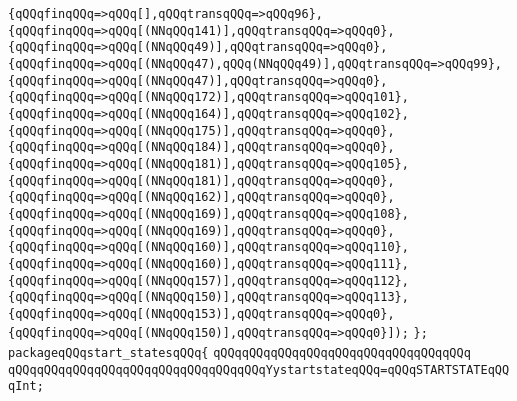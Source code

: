 \verb|{qQQqfinqQQq=>qQQq[],qQQqtransqQQq=>qQQq96},|\newline
\verb|{qQQqfinqQQq=>qQQq[(NNqQQq141)],qQQqtransqQQq=>qQQq0},|\newline
\verb|{qQQqfinqQQq=>qQQq[(NNqQQq49)],qQQqtransqQQq=>qQQq0},|\newline
\verb|{qQQqfinqQQq=>qQQq[(NNqQQq47),qQQq(NNqQQq49)],qQQqtransqQQq=>qQQq99},|\newline
\verb|{qQQqfinqQQq=>qQQq[(NNqQQq47)],qQQqtransqQQq=>qQQq0},|\newline
\verb|{qQQqfinqQQq=>qQQq[(NNqQQq172)],qQQqtransqQQq=>qQQq101},|\newline
\verb|{qQQqfinqQQq=>qQQq[(NNqQQq164)],qQQqtransqQQq=>qQQq102},|\newline
\verb|{qQQqfinqQQq=>qQQq[(NNqQQq175)],qQQqtransqQQq=>qQQq0},|\newline
\verb|{qQQqfinqQQq=>qQQq[(NNqQQq184)],qQQqtransqQQq=>qQQq0},|\newline
\verb|{qQQqfinqQQq=>qQQq[(NNqQQq181)],qQQqtransqQQq=>qQQq105},|\newline
\verb|{qQQqfinqQQq=>qQQq[(NNqQQq181)],qQQqtransqQQq=>qQQq0},|\newline
\verb|{qQQqfinqQQq=>qQQq[(NNqQQq162)],qQQqtransqQQq=>qQQq0},|\newline
\verb|{qQQqfinqQQq=>qQQq[(NNqQQq169)],qQQqtransqQQq=>qQQq108},|\newline
\verb|{qQQqfinqQQq=>qQQq[(NNqQQq169)],qQQqtransqQQq=>qQQq0},|\newline
\verb|{qQQqfinqQQq=>qQQq[(NNqQQq160)],qQQqtransqQQq=>qQQq110},|\newline
\verb|{qQQqfinqQQq=>qQQq[(NNqQQq160)],qQQqtransqQQq=>qQQq111},|\newline
\verb|{qQQqfinqQQq=>qQQq[(NNqQQq157)],qQQqtransqQQq=>qQQq112},|\newline
\verb|{qQQqfinqQQq=>qQQq[(NNqQQq150)],qQQqtransqQQq=>qQQq113},|\newline
\verb|{qQQqfinqQQq=>qQQq[(NNqQQq153)],qQQqtransqQQq=>qQQq0},|\newline
\verb|{qQQqfinqQQq=>qQQq[(NNqQQq150)],qQQqtransqQQq=>qQQq0}]);|\newline
\verb|};|\newline
\verb|packageqQQqstart_statesqQQq{|\newline
\verb|qQQqqQQqqQQqqQQqqQQqqQQqqQQqqQQqqQQq|\newline
\verb|qQQqqQQqqQQqqQQqqQQqqQQqqQQqqQQqqQQqYystartstateqQQq=qQQqSTARTSTATEqQQqInt;|\newline
\newline
